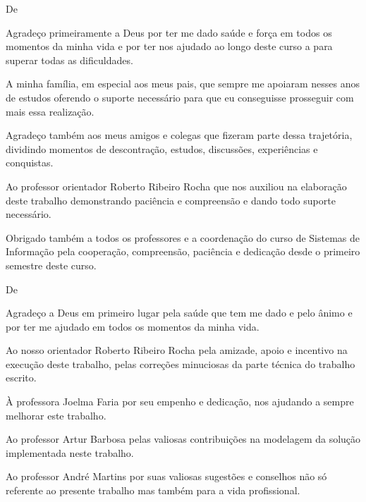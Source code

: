 \begin{agradecimentos}

De \imprimirAutorUm
\newline
\par Agradeço primeiramente a Deus por ter me dado saúde e força em todos os momentos
da minha vida e por ter nos ajudado ao longo deste curso a para superar todas as dificuldades.

\par A minha família, em especial aos meus pais, que sempre me apoiaram nesses anos
de estudos oferendo o suporte necessário para que eu conseguisse prosseguir com mais essa
realização.
 
\par Agradeço também aos meus amigos e colegas que fizeram parte dessa trajetória, dividindo 
momentos de descontração, estudos, discussões, experiências e conquistas.

\par Ao professor orientador Roberto Ribeiro Rocha que nos auxiliou na elaboração deste
trabalho demonstrando paciência e compreensão e dando todo suporte necessário.

\par Obrigado também a todos os professores e a coordenação do curso de Sistemas de Informação 
pela cooperação, compreensão, paciência e dedicação desde o primeiro semestre deste
curso.

\vspace*{\fill}
De \imprimirAutorDois
\newline
\par Agradeço a Deus em primeiro lugar pela saúde que tem me dado e pelo ânimo e por
ter me ajudado em todos os momentos da minha vida.

\par Ao nosso orientador Roberto Ribeiro Rocha pela amizade, apoio e incentivo na execução 
deste trabalho, pelas correções minuciosas da parte técnica do trabalho escrito.

\par À professora Joelma Faria por seu empenho e dedicação, nos ajudando a sempre melhorar
este trabalho.

\par Ao professor Artur Barbosa pelas valiosas contribuições na modelagem da solução implementada
neste trabalho.

\par Ao professor André Martins por suas valiosas sugestões e conselhos não só referente ao presente
trabalho mas também para a vida profissional. 


\end{agradecimentos}

